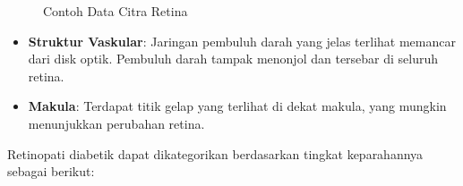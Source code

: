 	\begin{figure}[H]
		\centering
		\caption{Contoh Data Citra Retina}
		\label{fig:sampleDataset}
	\end{figure}

	\begin{itemize}
		\item \textbf{Struktur Vaskular}: Jaringan pembuluh darah yang jelas terlihat memancar dari disk optik. Pembuluh darah tampak menonjol dan tersebar di seluruh retina.
		\item \textbf{Makula}: Terdapat titik gelap yang terlihat di dekat makula, yang mungkin menunjukkan perubahan retina.
	\end{itemize}
Retinopati diabetik dapat dikategorikan berdasarkan tingkat keparahannya sebagai berikut:

